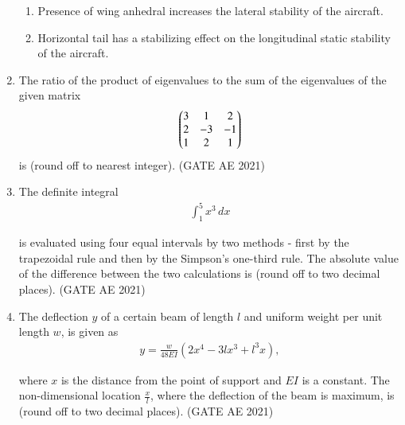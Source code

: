 \documentclass[journal,12pt,onecolumn]{IEEEtran}
\theoremstyle{remark}
\begin{document}
\begin{flushleft}
\begin{enumerate}
\begin{enumerate}
\item Presence of wing anhedral increases the lateral stability of the aircraft.

\item Horizontal tail has a stabilizing effect on the longitudinal static stability of the aircraft.
\end{enumerate}

\item  
The ratio of the product of eigenvalues to the sum of the eigenvalues of the given matrix
\[
\begin{pmatrix}3 & 1 & 2 \\ 2 & -3 & -1 \\ 1 & 2 & 1\end{pmatrix}
\]
is \underline{\hspace{2cm}} (round off to nearest integer).  
\hfill (GATE AE 2021)


\item  
The definite integral 
\begin{align*}
    \int_{1}^{5} x^3 \, dx
\end{align*}

is evaluated using four equal intervals by two methods - first by the trapezoidal rule and then by the Simpson's one-third rule. The absolute value of the difference between the two calculations is \underline{\hspace{2cm}} (round off to two decimal places).  
\hfill (GATE AE 2021)

\item  
The deflection \(y\) of a certain beam of length \(l\) and uniform weight per unit length \(w\), is given as  
\begin{align*}
    y = \frac{w}{48EI} \left( 2x^4 - 3lx^3 + l^3x \right),
\end{align*}

where \(x\) is the distance from the point of support and \(EI\) is a constant. The non-dimensional location \(\tfrac{x}{l}\), where the deflection of the beam is maximum, is \underline{\hspace{2cm}} (round off to two decimal places).  
\hfill (GATE AE 2021)


\end{enumerate}
\end{flushleft}
\end{document}
